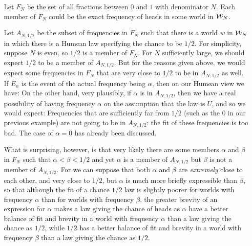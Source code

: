 Let $F_N$ be the set of all fractions between $0$ and $1$ with denominator $N$. Each member of $F_N$ could be the exact frequency
of heads in some world in $\mathcal W_N$.

Let $A_{N,1/2}$ be the subset of frequencies in $F_N$ such that there is a world $w$ in $\mathcal W_N$ in which there is a Humean
law specifying the chance to be $1/2$. For simplicity, suppose $N$ is even, so $1/2$ is a member of $F_N$. For $N$ sufficiently large, we 
should expect $1/2$ to be a member of $A_{N,1/2}$. But for the reasons given above, we would expect some frequencies in $F_N$ that are very
close to $1/2$ to be in $A_{N,1/2}$ as well. If $E_\alpha$ is the event of the actual frequency being $\alpha$, then on our Humean
view we have:
On the other hand, very plausibly, if $\alpha$ is in $A_{N,1/2}$, then we have a real possibility of having frequency $\alpha$
on the assumption that the law is $U$, and so we would expect:
Frequencies that are sufficiently far from $1/2$ (such as the $0$ in our previous example) are not going to be in $A_{N,1/2}$: the fit 
of these frequencies is too bad. The case of $\alpha=0$ has already been discussed.

What is surprising, however, is that very likely there are some members $\alpha$ and $\beta$ in $F_N$ such that $\alpha<\beta<1/2$
and yet $\alpha$ is a member of $A_{N,1/2}$ but $\beta$ is not a member of $A_{N,1/2}$. For we can suppose that both $\alpha$ and $\beta$
are \textit{extremely} close to each other, and very close to $1/2$, but $\alpha$ is much more briefly expressible than $\beta$, so that 
although the fit of a chance $1/2$ law is slightly poorer for worlds with frequency $\alpha$ than for worlds with frequency $\beta$,
the greater brevity of an expression for $\alpha$ makes a law giving the chance of heads as $\alpha$ have a better balance of fit and
brevity in a world with frequency $\alpha$ than a law giving the chance as $1/2$, while $1/2$ has a better balance of fit and brevity in 
a world with frequency $\beta$ than a law giving the chance as $1/2$.

